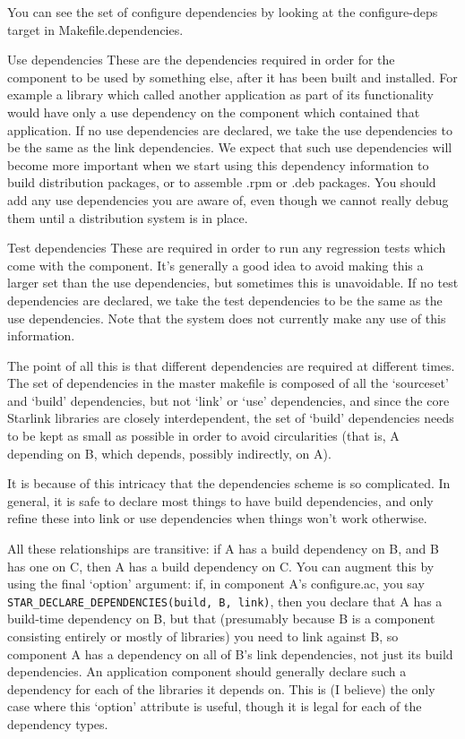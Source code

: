 \documentclass{speauth}
\begin{document}
You can see the set of configure dependencies by looking at the configure-deps target in Makefile.dependencies.

Use dependencies
These are the dependencies required in order for the component to be
used by something else, after it has been built and installed. For
example a library which called another application as part of its
functionality would have only a use dependency on the component which
contained that application. If no use dependencies are declared, we
take the use dependencies to be the same as the link dependencies. We
expect that such use dependencies will become more important when we
start using this dependency information to build distribution
packages, or to assemble .rpm or .deb packages. You should add any use
dependencies you are aware of, even though we cannot really debug them
until a distribution system is in place. 

Test dependencies
These are required in order to run any regression tests which come
with the component. It's generally a good idea to avoid making this a
larger set than the use dependencies, but sometimes this is
unavoidable. If no test dependencies are declared, we take the test
dependencies to be the same as the use dependencies. Note that the
system does not currently make any use of this information.

The point of all this is that different dependencies are required at
different times. The set of dependencies in the master makefile is
composed of all the `sourceset' and `build' dependencies, but not
`link' or `use' dependencies, and since the core Starlink libraries
are closely interdependent, the set of `build' dependencies needs to
be kept as small as possible in order to avoid circularities (that is,
A depending on B, which depends, possibly indirectly, on A).


It is because of this intricacy that the dependencies scheme is so
complicated. In general, it is safe to declare most things to have
build dependencies, and only refine these into link or use
dependencies when things won't work otherwise.


All these relationships are transitive: if A has a build dependency on
B, and B has one on C, then A has a build dependency on C. You can
augment this by using the final `option' argument: if, in component
A's configure.ac, you say \verb|STAR_DECLARE_DEPENDENCIES(build, B, link)|,
then you declare that A has a build-time dependency on B, but that
(presumably because B is a component consisting entirely or mostly of
libraries) you need to link against B, so component A has a dependency
on all of B's link dependencies, not just its build dependencies. An
application component should generally declare such a dependency for
each of the libraries it depends on. This is (I believe) the only case
where this `option' attribute is useful, though it is legal for each
of the dependency types.
\end{document}

